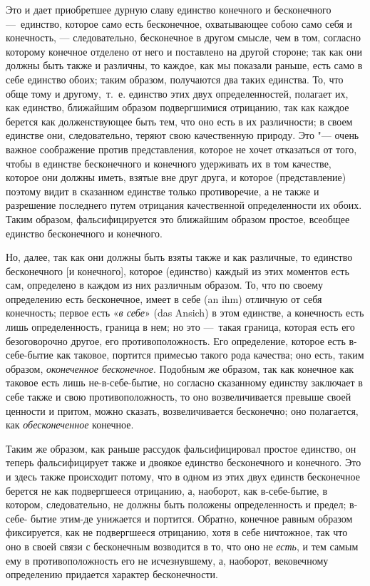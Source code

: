 Это и дает приобретшее дурную славу единство конечного и бесконечного
—~единство, которое само есть бесконечное, охватывающее собою само себя и
конечность, — следовательно, бесконечное в другом смысле, чем в том,
согласно которому конечное отделено от него и поставлено на другой стороне;
так как они должны быть также и различны, то каждое, как мы показали
раньше, есть само в себе единство обоих; таким образом, получаются два
таких единства. То, что обще тому и другому,~т.~е. единство этих двух
определенностей, полагает их, как единство, ближайшим образом подвергшимися
отрицанию, так как каждое берется как долженствующее быть тем, что оно есть
в их различности; в своем единстве они, следовательно, теряют свою
качественную природу. Это "--- очень важное соображение против представления,
которое не хочет отказаться от того, чтобы в единстве бесконечного и
конечного удерживать их в том качестве, которое они должны иметь, взятые
вне друг друга, и которое (представление) поэтому видит в сказанном
единстве только противоречие, а не также и разрешение последнего путем
отрицания качественной определенности их обоих. Таким образом,
фальсифицируется это ближайшим образом простое, всеобщее единство
бесконечного и конечного.

Но, далее, так как они должны быть взяты также и как различные, то единство
бесконечного [и конечного], которое (единство) каждый из этих моментов есть
сам, определено в каждом из них различным образом. То, что по своему
определению есть бесконечное, имеет в себе (an ihm) отличную от себя
конечность; первое есть «{\em в себе}» (das Ansich) в
этом единстве, а конечность есть лишь определенность, граница в нем; но это
—~такая граница, которая есть его безоговорочно другое, его
противоположность. Его определение, которое есть в-себе-бытие как таковое,
портится примесью такого рода качества; оно есть, таким образом,
{\em оконеченное бесконечное}. Подобным же образом, так
как конечное как таковое есть лишь не-в-себе-бытие, но согласно сказанному
единству заключает в себе также и свою противоположность, то оно
возвеличивается превыше своей ценности и притом, можно сказать,
возвеличивается бесконечно; оно полагается, как
{\em обесконеченное} конечное.

Таким же образом, как раньше рассудок фальсифицировал простое единство, он
теперь фальсифицирует также и двоякое единство бесконечного и конечного.
Это и здесь также происходит потому, что в одном из этих двух единств
бесконечное берется не как подвергшееся отрицанию, а, наоборот, как
в-себе-бытие, в котором, следовательно, не должны быть положены
определенность и предел; в-себе- бытие этим-де унижается и портится.
Обратно, конечное равным образом фиксируется, как не подвергшееся
отрицанию, хотя в себе ничтожное, так что оно в своей связи с бесконечным
возводится в то, что оно не {\em есть}, и тем самым ему
в противоположность его не исчезнувшему, а, наоборот, вековечному
определению придается характер бесконечности.

